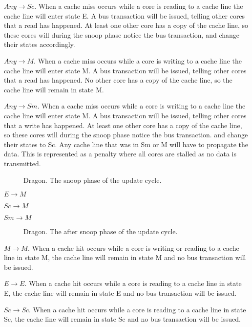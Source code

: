 $Any \to Sc$.
When a cache miss occurs while a core is reading to a cache line the cache line will enter state E.
A bus transaction will be issued, telling other cores that a read has happened.
At least one other core has a copy of the cache line, so these cores will during the snoop phase notice the bus transaction, and change their states accordingly.

$Any \to M$.
When a cache miss occurs while a core is writing to a cache line the cache line will enter state M.
A bus transaction will be issued, telling other cores that a read has happened.
No other core has a copy of the cache line, so the cache line will remain in state M.

$Any \to Sm$.
When a cache miss occurs while a core is writing to a cache line the cache line will enter state M.
A bus transaction will be issued, telling other cores that a write has happened.
At least one other core has a copy of the cache line, so these cores will during the snoop phase notice the bus transaction.
and change their states to Sc.
Any cache line that was in Sm or M will have to propagate the data.
This is represented as a penalty where all cores are stalled as no data is transmitted.

\begin{figure}[H]
    \centering
    \caption{Dragon. The snoop phase of the update cycle.}
    \label{fig:dragon_snoop}
\end{figure}

$E \to M$

$Sc \to M$

$Sm \to M$


\begin{figure}[H]
    \centering
    \caption{Dragon. The after snoop phase of the update cycle.}
    \label{fig:dragon_after_snoop}
\end{figure}

$M \to M$.
When a cache hit occurs while a core is writing or reading to a cache line in state M, the cache line will remain in state M and no bus transaction will be issued.

$E \to E$.
When a cache hit occurs while a core is reading to a cache line in state E, the cache line will remain in state E and no bus transaction will be issued.

$Sc \to Sc$.
When a cache hit occurs while a core is reading to a cache line in state Sc, the cache line will remain in state Sc and no bus transaction will be issued.

